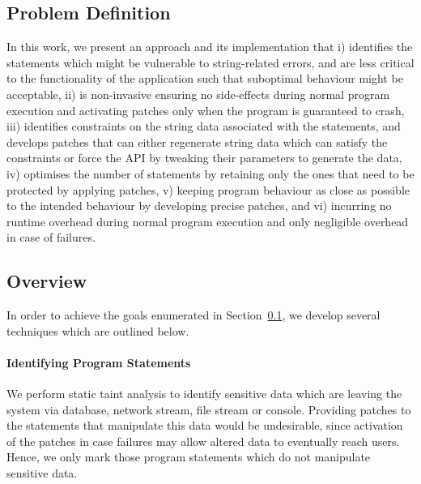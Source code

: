 \subsection{Problem Definition}
\label{subsec:problem}

In this work, we present an approach and its implementation that i) identifies the statements which might be vulnerable to string-related errors,
and are less critical to the functionality of the application such that suboptimal behaviour might be acceptable, ii) is non-invasive ensuring no 
side-effects during normal program execution and activating patches only when the program is guaranteed to crash, iii) identifies constraints on the string
data associated with the statements, and develops patches that can either regenerate string data which can satisfy the constraints
or force the \java{} API by tweaking their parameters to generate the data, iv) optimises the
number of statements by retaining only the ones that need to be protected by applying patches,  v) keeping program behaviour as close as possible to the
intended behaviour by developing precise patches, and vi) incurring no runtime overhead during normal program execution and only negligible overhead in case of failures.

\subsection{Overview}
\label{subsec:overview}

In order to achieve the goals enumerated in Section~\ref{subsec:problem}, we develop
several techniques which are outlined below.

\paragraph{Identifying Program Statements} We perform static taint analysis
to identify sensitive data which are leaving the system via database, network
stream, file stream or console. Providing patches to the
statements that manipulate this data would be undesirable, since
activation of the patches in case failures may allow altered data to eventually reach
users. Hence, we only mark those program statements which do not manipulate
sensitive data.


